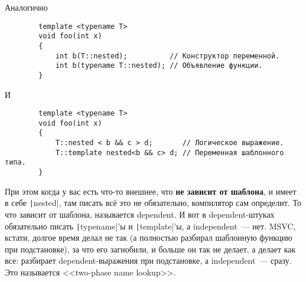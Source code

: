 \documentclass{article}
\begin{document}
    Аналогично
    \begin{verbatim}
        template <typename T>
        void foo(int x)
        {
            int b(T::nested);          // Конструктор переменной.
            int b(typename T::nested); // Объявление функции.
        }
    \end{verbatim}
    И
    \begin{verbatim}
        template <typename T>
        void foo(int x)
        {
            T::nested < b && c > d;       // Логическое выражение.
            T::template nested<b && c> d; // Переменная шаблонного типа.
        }
    \end{verbatim}
    При этом когда у вас есть что-то внешнее, что \textbf{не зависит от шаблона}, и имеет в себе \texttt|nested|, там писать всё это не обязательно, компилятор сам определит. То что зависит от шаблона, называется dependent. И вот в dependent-штуках обязательно писать \texttt|typename|'ы и \texttt|template|'ы, а independent~--- нет. MSVC, кстати, долгое время делал не так (а полностью разбирал шаблонную функцию при подстановке), за что его загнобили, и больше он так не делает, а делает как все: разбирает dependent-выражения при подстановке, а independent~--- сразу. Это называется <<two-phase name lookup>>.
\end{document}

